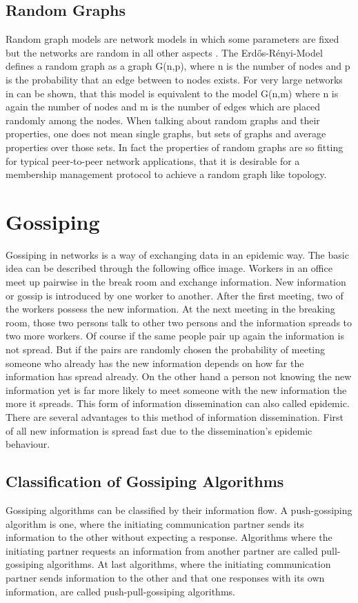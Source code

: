 \subsection{Random Graphs}
Random graph models are network models in which some parameters are fixed but
the networks are random in all other aspects \cite{Bollobas1985}. The
Erd\H{o}s-R\'{e}nyi-Model \cite{erd6s1960evolution} defines a random graph as a
graph G(n,p), where n is the number of nodes and p is the probability that an
edge between to nodes exists. For very large networks in can be shown, that this
model is equivalent to the model G(n,m) where n is again the number of nodes
and m is the number of edges which are placed randomly among the nodes. When
talking about random graphs and their properties, one does not mean single
graphs, but sets of graphs and average properties over those sets. In fact the
properties of random graphs are so fitting for typical peer-to-peer network
applications, that it is desirable for a membership management protocol to
achieve a random graph like topology.
% 

\section{Gossiping}
Gossiping in networks is a way of exchanging data in an epidemic way. The basic
idea can be described through the following office image. Workers in an office
meet up pairwise in the break room and exchange information. New information or
gossip is introduced by one worker to another. After the first meeting, two of
the workers possess the new information. At the next meeting in the breaking
room, those two persons talk to other two persons and the information spreads to
two more workers. Of course if the same people pair up again the information is not
spread. But if the pairs are randomly chosen the probability of meeting someone
who already has the new information depends on how far the information has
spread already. On the other hand a person not knowing the new information yet
is far more likely to meet someone with the new information the more it spreads.
This form of information dissemination can also called epidemic. There are
several advantages to this method of information dissemination. First of all new
information is spread fast due to the dissemination's epidemic behaviour. 

\subsection{Classification of Gossiping Algorithms}
Gossiping algorithms can be classified by their information flow. A
push-gossiping algorithm is one, where the initiating communication partner
sends its information to the other without expecting a response. Algorithms
where the initiating partner requests an information from another partner are
called pull-gossiping algorithms. At last algorithms, where the initiating
communication partner sends information to the other and that one responses with
its own information, are called push-pull-gossiping algorithms.


